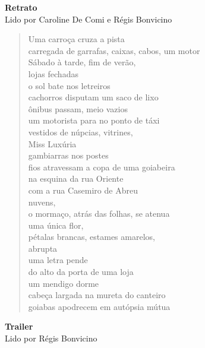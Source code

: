 \pagebreak
\textbf{Retrato}\\
Lido por Caroline De Comi e Régis Bonvicino

\begin{verse}
Uma carroça cruza a pista\\
carregada de garrafas, caixas, cabos, um motor\\
Sábado à tarde, fim de verão,\\
lojas fechadas\\[5pt]
o sol bate nos letreiros\\
cachorros disputam um saco de lixo\\
ônibus passam, meio vazios\\
um motorista para no ponto de táxi\\[5pt]
vestidos de núpcias, vitrines,\\
Miss Luxúria\\
gambiarras nos postes\\
fios atravessam a copa de uma goiabeira\\[5pt]
na esquina da rua Oriente\\
com a rua Casemiro de Abreu\\
nuvens,\\
o mormaço, atrás das folhas, se atenua\\[5pt]
uma única flor,\\
pétalas brancas, estames amarelos,\\
abrupta\\
uma letra pende\\[5pt]
do alto da porta de uma loja\\
um mendigo dorme\\
cabeça largada na mureta do canteiro\\
goiabas apodrecem em autópsia mútua
\end{verse}

\pagebreak
\textbf{Trailer}\\
Lido por Régis Bonvicino

